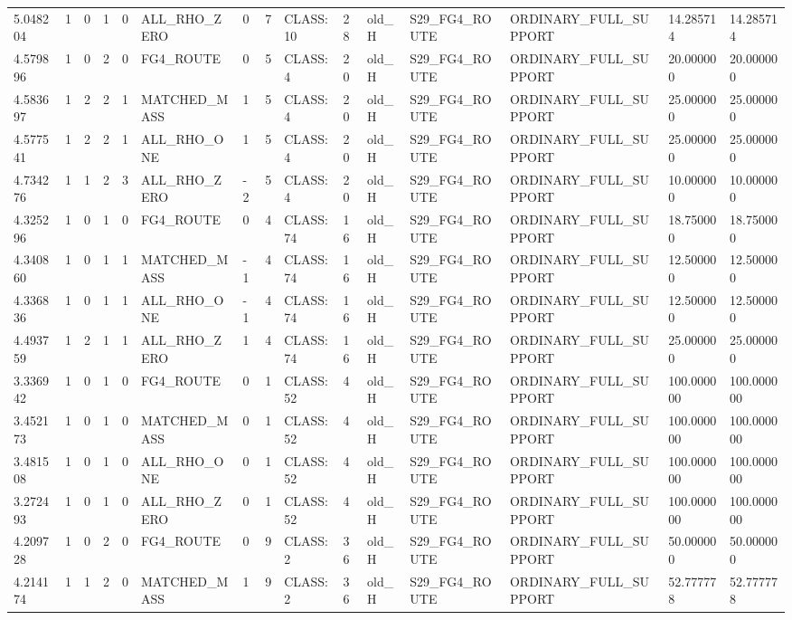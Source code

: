 \begin{tabular}{lllllllllllllll}
5.048204 & 1 & 0 & 1 & 0 & ALL\_RHO\_ZERO & 0 & 7 & CLASS:10 & 28 & old\_H & S29\_FG4\_ROUTE & ORDINARY\_FULL\_SUPPORT & 14.285714 & 14.285714 \\
4.579896 & 1 & 0 & 2 & 0 & FG4\_ROUTE & 0 & 5 & CLASS:4 & 20 & old\_H & S29\_FG4\_ROUTE & ORDINARY\_FULL\_SUPPORT & 20.000000 & 20.000000 \\
4.583697 & 1 & 2 & 2 & 1 & MATCHED\_MASS & 1 & 5 & CLASS:4 & 20 & old\_H & S29\_FG4\_ROUTE & ORDINARY\_FULL\_SUPPORT & 25.000000 & 25.000000 \\
4.577541 & 1 & 2 & 2 & 1 & ALL\_RHO\_ONE & 1 & 5 & CLASS:4 & 20 & old\_H & S29\_FG4\_ROUTE & ORDINARY\_FULL\_SUPPORT & 25.000000 & 25.000000 \\
4.734276 & 1 & 1 & 2 & 3 & ALL\_RHO\_ZERO & -2 & 5 & CLASS:4 & 20 & old\_H & S29\_FG4\_ROUTE & ORDINARY\_FULL\_SUPPORT & 10.000000 & 10.000000 \\
4.325296 & 1 & 0 & 1 & 0 & FG4\_ROUTE & 0 & 4 & CLASS:74 & 16 & old\_H & S29\_FG4\_ROUTE & ORDINARY\_FULL\_SUPPORT & 18.750000 & 18.750000 \\
4.340860 & 1 & 0 & 1 & 1 & MATCHED\_MASS & -1 & 4 & CLASS:74 & 16 & old\_H & S29\_FG4\_ROUTE & ORDINARY\_FULL\_SUPPORT & 12.500000 & 12.500000 \\
4.336836 & 1 & 0 & 1 & 1 & ALL\_RHO\_ONE & -1 & 4 & CLASS:74 & 16 & old\_H & S29\_FG4\_ROUTE & ORDINARY\_FULL\_SUPPORT & 12.500000 & 12.500000 \\
4.493759 & 1 & 2 & 1 & 1 & ALL\_RHO\_ZERO & 1 & 4 & CLASS:74 & 16 & old\_H & S29\_FG4\_ROUTE & ORDINARY\_FULL\_SUPPORT & 25.000000 & 25.000000 \\
3.336942 & 1 & 0 & 1 & 0 & FG4\_ROUTE & 0 & 1 & CLASS:52 & 4 & old\_H & S29\_FG4\_ROUTE & ORDINARY\_FULL\_SUPPORT & 100.000000 & 100.000000 \\
3.452173 & 1 & 0 & 1 & 0 & MATCHED\_MASS & 0 & 1 & CLASS:52 & 4 & old\_H & S29\_FG4\_ROUTE & ORDINARY\_FULL\_SUPPORT & 100.000000 & 100.000000 \\
3.481508 & 1 & 0 & 1 & 0 & ALL\_RHO\_ONE & 0 & 1 & CLASS:52 & 4 & old\_H & S29\_FG4\_ROUTE & ORDINARY\_FULL\_SUPPORT & 100.000000 & 100.000000 \\
3.272493 & 1 & 0 & 1 & 0 & ALL\_RHO\_ZERO & 0 & 1 & CLASS:52 & 4 & old\_H & S29\_FG4\_ROUTE & ORDINARY\_FULL\_SUPPORT & 100.000000 & 100.000000 \\
4.209728 & 1 & 0 & 2 & 0 & FG4\_ROUTE & 0 & 9 & CLASS:2 & 36 & old\_H & S29\_FG4\_ROUTE & ORDINARY\_FULL\_SUPPORT & 50.000000 & 50.000000 \\
4.214174 & 1 & 1 & 2 & 0 & MATCHED\_MASS & 1 & 9 & CLASS:2 & 36 & old\_H & S29\_FG4\_ROUTE & ORDINARY\_FULL\_SUPPORT & 52.777778 & 52.777778 \\

\end{tabular}
